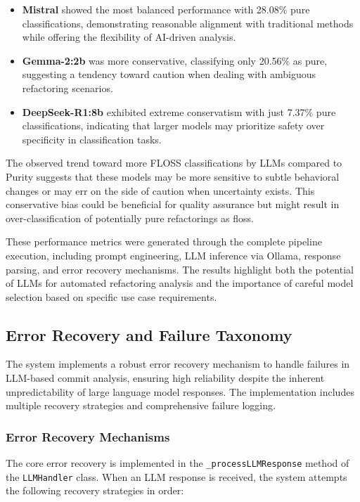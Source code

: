 \begin{itemize}
    \item \textbf{Mistral} showed the most balanced performance with 28.08\% pure classifications, demonstrating reasonable alignment with traditional methods while offering the flexibility of AI-driven analysis.
    \item \textbf{Gemma-2:2b} was more conservative, classifying only 20.56\% as pure, suggesting a tendency toward caution when dealing with ambiguous refactoring scenarios.
    \item \textbf{DeepSeek-R1:8b} exhibited extreme conservatism with just 7.37\% pure classifications, indicating that larger models may prioritize safety over specificity in classification tasks.
\end{itemize}

The observed trend toward more FLOSS classifications by LLMs compared to Purity suggests that these models may be more sensitive to subtle behavioral changes or may err on the side of caution when uncertainty exists. This conservative bias could be beneficial for quality assurance but might result in over-classification of potentially pure refactorings as floss.

These performance metrics were generated through the complete pipeline execution, including prompt engineering, LLM inference via Ollama, response parsing, and error recovery mechanisms. The results highlight both the potential of LLMs for automated refactoring analysis and the importance of careful model selection based on specific use case requirements. 

\subsection{Error Recovery and Failure Taxonomy}
The system implements a robust error recovery mechanism to handle failures in LLM-based commit analysis, ensuring high reliability despite the inherent unpredictability of large language model responses. The implementation includes multiple recovery strategies and comprehensive failure logging.
\subsubsection{Error Recovery Mechanisms}
The core error recovery is implemented in the \texttt{\_processLLMResponse} method of the \texttt{LLMHandler} class. When an LLM response is received, the system attempts the following recovery strategies in order:

